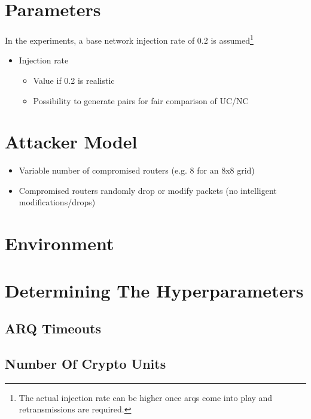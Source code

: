 \section{Parameters}
In the experiments, a base network injection rate of 0.2 is assumed\footnote{The actual injection rate can be higher once \glspl{arq} come into play
and retransmissions are required.}
\begin{itemize}
    \item Injection rate
        \begin{itemize}
            \item Value if 0.2 is realistic
            \item Possibility to generate pairs for fair comparison of UC/NC
        \end{itemize}
\end{itemize}

\section{Attacker Model}
\begin{itemize}
    \item Variable number of compromised routers (e.g. 8 for an 8x8 grid)
    \item Compromised routers randomly drop or modify packets (no intelligent modifications/drops)
\end{itemize}

\section{Environment}

\section{Determining The Hyperparameters}
\subsection{ARQ Timeouts}
\subsection{Number Of Crypto Units}

